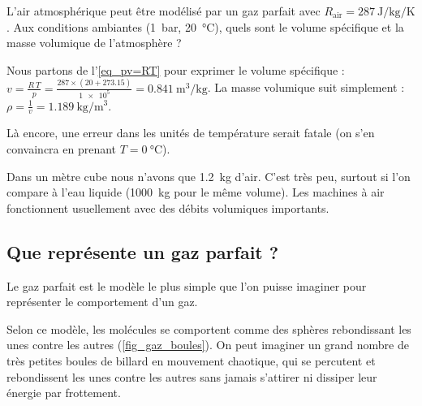 			\begin{anexample}
				L’air atmosphérique peut être modélisé par un gaz parfait avec $R_\text{air} = \SI{287}{\joule\per\kilogram\per\kelvin}$. Aux conditions ambiantes (\SI{1}{\bar}, \SI{20}{\degreeCelsius}), quels sont le volume spécifique et la masse volumique de l’atmosphère ?
				\begin{answer}
					Nous partons de l’\cref{eq_pv=RT} pour exprimer le volume spécifique : $v = \frac{R \ T}{p} = \frac{\num{287} \times (\num{20} + \num{273,15})}{\num{1e5}} = \SI{0,841}{\metre\cubed\per\kilogram}$. La masse volumique suit simplement : $\rho = \frac{1}{v} = \SI{1,189}{\kilogram\per\metre\cubed}$.
				\end{answer}
					\begin{remark}Là encore, une erreur dans les unités de température serait fatale (on s’en convaincra en prenant $T = \SI{0}{\degreeCelsius}$).\end{remark}
					\begin{remark}Dans un mètre cube nous n’avons que \SI{1,2}{\kilogram} d’air. C’est très peu, surtout si l’on compare à l’eau liquide (\SI{1000}{\kilogram} pour le même volume). Les machines à air fonctionnent usuellement avec des débits volumiques importants.\end{remark}
			\end{anexample}


	\subsection{Que représente un gaz parfait ?}
	\label{ch_gaz_parfait_kezako}

		Le gaz parfait est le modèle le plus simple que l’on puisse imaginer pour représenter le comportement d’un gaz.
		
		Selon ce modèle, les molécules se comportent comme des sphères rebondissant les unes contre les autres (\cref{fig_gaz_boules}). On peut imaginer un grand nombre de très petites boules de billard en mouvement chaotique, qui se percutent et rebondissent les unes contre les autres sans jamais s’attirer ni dissiper leur énergie par frottement.
		
